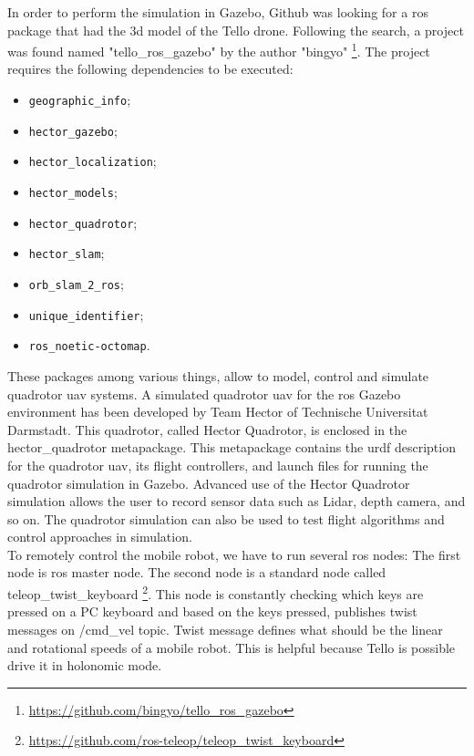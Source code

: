 \noindent In order to perform the simulation in Gazebo, Github was looking for a \gls{ros} package that had the \gls{3d} model of the Tello drone. Following the search, a project was found named "tello\_ros\_gazebo" by the author "bingyo" \footnote{\url{https://github.com/bingyo/tello_ros_gazebo}}. The project requires the following dependencies to be executed:

\begin{itemize}
	\item \texttt{geographic\_info};
	\item \texttt{hector\_gazebo};
	\item \texttt{hector\_localization};
	\item \texttt{hector\_models};
	\item \texttt{hector\_quadrotor};
	\item \texttt{hector\_slam};
	\item \texttt{orb\_slam\_2\_ros};
	\item \texttt{unique\_identifier};
	\item \texttt{ros\_noetic-octomap}.
\end{itemize}

\noindent These packages among various things, allow to model, control and simulate quadrotor \gls{uav} systems. A simulated quadrotor \gls{uav} for the \gls{ros} Gazebo environment has been developed by Team Hector of Technische Universitat Darmstadt. This quadrotor, called Hector Quadrotor, is enclosed in the hector\_quadrotor metapackage. This metapackage contains the \gls{urdf} description for the quadrotor \gls{uav}, its flight controllers, and launch files for running the quadrotor simulation in Gazebo. Advanced use of the Hector Quadrotor simulation allows the user to record sensor data such as Lidar, depth camera, and so on. The quadrotor simulation can also be used to test flight algorithms and control approaches in simulation. \\

\noindent To remotely control the mobile robot, we have to run several \gls{ros} nodes: The first node is \gls{ros} master node. The second node is a standard node called teleop\_twist\_keyboard \footnote{\url{https://github.com/ros-teleop/teleop_twist_keyboard}}. This node is constantly checking which keys are pressed on a PC keyboard and based on the keys pressed, publishes twist messages on /cmd\_vel topic. Twist message defines what should be the linear and rotational speeds of a mobile robot. This is helpful because Tello is possible drive it in holonomic mode. \\

